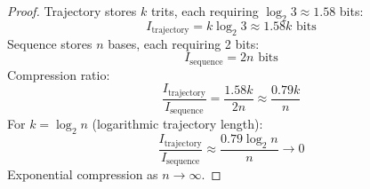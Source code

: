 \documentclass[11pt,a4paper]{article}
\theoremstyle{remark}
\begin{document}
\begin{proof}
Trajectory stores $k$ trits, each requiring $\log_2 3 \approx 1.58$ bits:
\begin{equation}
I_{\text{trajectory}} = k\log_2 3 \approx 1.58k \text{ bits}
\end{equation}
Sequence stores $n$ bases, each requiring 2 bits:
\begin{equation}
I_{\text{sequence}} = 2n \text{ bits}
\end{equation}
Compression ratio:
\begin{equation}
\frac{I_{\text{trajectory}}}{I_{\text{sequence}}} = \frac{1.58k}{2n} \approx \frac{0.79k}{n}
\end{equation}
For $k = \log_2 n$ (logarithmic trajectory length):
\begin{equation}
\frac{I_{\text{trajectory}}}{I_{\text{sequence}}} \approx \frac{0.79\log_2 n}{n} \to 0
\end{equation}
Exponential compression as $n \to \infty$.
\end{proof}
\end{document}
